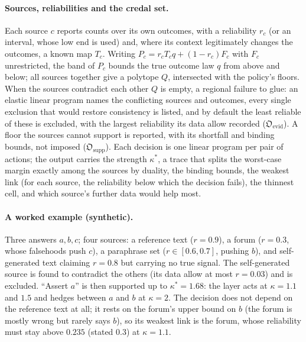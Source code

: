 \documentclass[11pt]{article}
\theoremstyle{definition}
\theoremstyle{remark}
\begin{document}
\paragraph{Sources, reliabilities and the credal set.} Each source $c$ reports counts over its own outcomes, with a reliability $r_c$
(or an interval, whose low end is used) and, where its context legitimately changes the outcomes, a known map $T_c$. Writing
$P_c=r_cT_cq+(1-r_c)F_c$ with $F_c$ unrestricted, the band of $P_c$ bounds the true outcome law $q$ from above and below; all sources
together give a polytope $Q$, intersected with the policy's floors. When the sources contradict each other $Q$ is empty, a regional
failure to glue: an elastic linear program names the conflicting sources and outcomes, every single exclusion that would restore
consistency is listed, and by default the least reliable of these is excluded, with the largest reliability its data allow recorded
($\mathfrak O_{\mathrm{evid}}$). A floor the sources cannot support is reported, with its shortfall and binding bounds, not imposed
($\mathfrak O_{\mathrm{supp}}$). Each decision is one linear program per pair of actions; the output carries the strength
$\kappa^*$, a trace that splits the worst-case margin exactly among the sources by duality, the binding bounds, the weakest link
(for each source, the reliability below which the decision fails), the thinnest cell, and which source's further data would help most.

\paragraph{A worked example (synthetic).} Three answers $a,b,c$; four sources: a reference text ($r=0.9$), a forum ($r=0.3$, whose
falsehoods push $c$), a paraphrase set ($r\in[0.6,0.7]$, pushing $b$), and self-generated text claiming $r=0.8$ but carrying no true
signal. The self-generated source is found to contradict the others (its data allow at most $r=0.03$) and is excluded. ``Assert $a$''
is then supported up to $\kappa^*=1.68$: the layer acts at $\kappa=1.1$ and $1.5$ and hedges between $a$ and $b$ at $\kappa=2$. The
decision does not depend on the reference text at all; it rests on the forum's upper bound on $b$ (the forum is mostly wrong but
rarely says $b$), so its weakest link is the forum, whose reliability must stay above $0.235$ (stated $0.3$) at $\kappa=1.1$.
\end{document}
